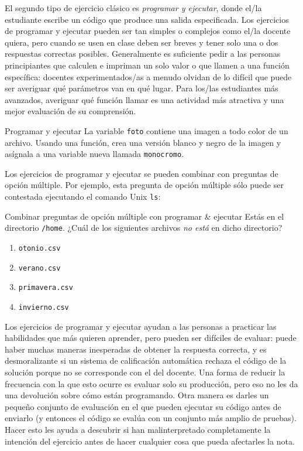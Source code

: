 El segundo tipo de ejercicio clásico es \emph{programar y ejecutar},
donde el/la estudiante escribe un código que produce una salida especificada. 
Los ejercicios de programar y ejecutar pueden ser tan simples o complejos como el/la docente quiera, pero cuando se usen en clase deben ser breves y tener solo una o dos respuestas correctas posibles.
Generalmente es suficiente pedir a las personas principiantes que calculen e impriman un solo valor o que llamen a una función específica:
docentes experimentados/as a menudo olvidan de lo difícil que puede ser averiguar qué parámetros van en qué lugar.
Para los/las estudiantes  más avanzados, averiguar qué función llamar es una actividad más atractiva y una mejor evaluación de su comprensión.

\begin{aside}{Programar y ejecutar}
La variable \texttt{foto} contiene una imagen a todo color de un archivo.
Usando una función,
crea una versión blanco y negro de la imagen
y asígnala a una variable nueva llamada \texttt{monocromo}.
\end{aside}

Los ejercicios de programar y ejecutar se pueden combinar con preguntas de opción múltiple.
Por ejemplo,
esta pregunta de opción múltiple sólo puede ser contestada ejecutando el comando Unix \texttt{ls}:

\begin{aside}{Combinar preguntas de opción múltiple con programar \& ejecutar}
  Estás en el directorio  \texttt{/home}.
  ¿Cuál de los siguientes archivos \emph{no está} en dicho directorio?
  \begin{enumerate}
  \item
    \texttt{otonio.csv}
  \item
    \texttt{verano.csv}
  \item
    \texttt{primavera.csv}
  \item
    \texttt{invierno.csv}
  \end{enumerate}
\end{aside}

Los ejercicios de programar y ejecutar ayudan a las personas a practicar las habilidades que más quieren aprender,
pero pueden ser  difíciles de evaluar:
puede haber muchas maneras inesperadas de obtener la respuesta correcta,
y es desmoralizante si un sistema de calificación automática rechaza el código de la solución porque no se corresponde con el del docente.
Una forma de reducir la frecuencia con la que esto ocurre es evaluar solo su producción,
pero eso no les da una devolución sobre cómo están programando.
Otra manera es darles un pequeño conjunto de evaluación en el que pueden ejecutar su código antes de enviarlo
(y entonces el código se evalúa con un conjunto más amplio de pruebas).
Hacer esto les ayuda a descubrir si han malinterpretado completamente la intención del ejercicio antes de hacer cualquier cosa que pueda afectarles la nota.

